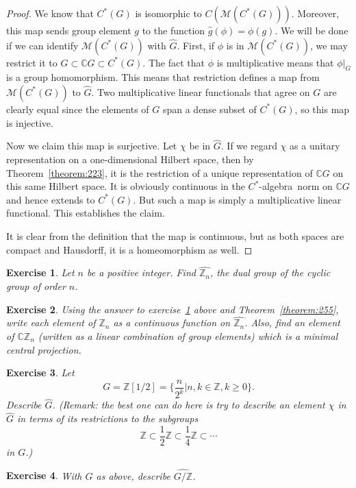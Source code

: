 \documentclass{book}
\newtheorem{exercise}{Exercise}[section]
\def\cstar{\(C^*\)-algebra}
\begin{document}
\begin{proof}
  We know that \(C^*(G)\) is isomorphic to \(C(\mathcal{M}(C^*(G)))\). Moreover, this
  map sends group element \(g\) to the function \(\hat{g}(\phi) = \phi(g)\). We will be done
  if we can identify \(\mathcal{M}(C^*(G))\) with \(\hat{G}\). First, if \(\phi\) is in \(\mathcal{M}(C^*(G))\), we may
  restrict it to \(G \subset \mathbb{C}G \subset C^*(G)\). The fact that \(\phi\) is multiplicative means that
  \(\phi|_G\) is a group homomorphism. This means that restriction defines a map
  from \(\mathcal{M}(C^*(G))\) to \(\hat{G}\). Two multiplicative linear functionals that agree on
  \(G\) are clearly equal since the elements of \(G\) span a dense subset of \(C^*(G)\), so
  this map is injective.\par
  Now we claim this map is surjective. Let \(\chi\) be in \(\hat{G}\). If we regard \(\chi\) as a
  unitary representation on a one-dimensional Hilbert space, then by Theorem~\ref{theorem:223}, 
  it is the restriction of a unique representation of \(\mathbb{C}G\) on this same
  Hilbert space. It is obviously continuous in the \cstar\ norm on \(\mathbb{C}G\) and
  hence extends to \(C^*(G)\). But such a map is simply a multiplicative linear
  functional. This establishes the claim.\par
  It is clear from the definition that the map is continuous, but as both
  spaces are compact and Hausdorff, it is a homeomorphism as well.
\end{proof}
\begin{exercise}\label{ex:251}
  Let \(n\) be a positive integer. Find \(\hat{\mathbb{Z}_n}\), the dual group of the
  cyclic group of order \(n\).
\end{exercise}
\begin{exercise}
  Using the answer to exercise~\ref{ex:251} above and Theorem~\ref{theorem:255},
  write each element of \(\mathbb{Z}_n\) as a continuous function on \(\hat{\mathbb{Z}_n}\). Also, find an
  element of \(\mathbb{C}\mathbb{Z}_n\) (written as a linear combination of group elements) which is
  a minimal central projection.
\end{exercise}
\begin{exercise}
  Let
  \[
    G=\mathbb{Z}[1/2] = \{\frac{n}{2^k} | n,k \in \mathbb{Z},k \geq 0 \}.
  \]
  Describe \(\hat{G}\). (Remark: the best one can do here is try to describe an element
  \(\chi\) in \(\hat{G}\) in terms of its restrictions to the subgroups
  \[
    \mathbb{Z} \subset \frac{1}{2}\mathbb{Z} \subset \frac{1}{4}\mathbb{Z} \subset \cdots
  \]
  in \(G\).)
\end{exercise}
\begin{exercise}
  With \(G\) as above, describe \(\hat{G/\mathbb{Z}}\).
\end{exercise}
\end{document}
